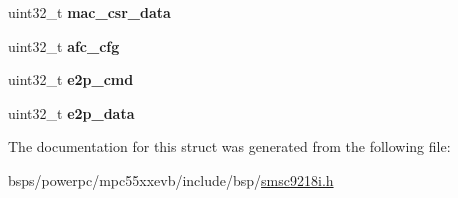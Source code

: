 \begin{DoxyCompactItemize}
\item 
\mbox{\label{structsmsc9218i__registers_a4ae992073b7335208e30f6494d154766}} 
uint32\+\_\+t {\bfseries mac\+\_\+csr\+\_\+data}
\item 
\mbox{\label{structsmsc9218i__registers_ab4c916f06a69992459d6746533ee4229}} 
uint32\+\_\+t {\bfseries afc\+\_\+cfg}
\item 
\mbox{\label{structsmsc9218i__registers_a15169d1e4f1c796f24fa50d1bda0551f}} 
uint32\+\_\+t {\bfseries e2p\+\_\+cmd}
\item 
\mbox{\label{structsmsc9218i__registers_acbd5a45b5a33df9e63bb487a24b04f68}} 
uint32\+\_\+t {\bfseries e2p\+\_\+data}
\end{DoxyCompactItemize}


The documentation for this struct was generated from the following file\+:\begin{DoxyCompactItemize}
\item 
bsps/powerpc/mpc55xxevb/include/bsp/\mbox{\hyperlink{smsc9218i_8h}{smsc9218i.\+h}}\end{DoxyCompactItemize}

